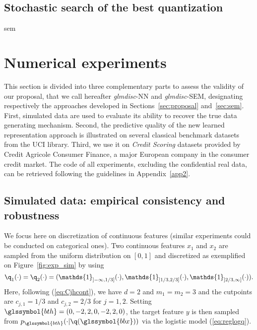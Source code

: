 \subsection{Stochastic search of the best quantization} \label{subsec:stoch}

\gls{sem}




\section{Numerical experiments} \label{sec:experiments}

This section is divided into three complementary parts to assess the validity of our proposal, that we call hereafter \textit{glmdisc}-NN and \textit{glmdisc}-SEM, designating respectively the approaches developed in Sections~\ref{sec:proposal} and~\ref{sec:sem}. First, simulated data are used to evaluate its ability to recover the true data generating mechanism. Second, the predictive quality of the new learned representation approach is illustrated on several classical benchmark datasets from the UCI library. Third, we use it on \textit{Credit Scoring} datasets provided by Credit Agricole Consumer Finance, a major European company in the consumer credit market. The code of all experiments, excluding the confidential real data, can be retrieved following the guidelines in Appendix~\ref{app2}.


\subsection{Simulated data: empirical consistency and robustness}

We focus here on discretization of continuous features (similar experiments could be conducted on categorical ones). Two continuous features $x_1$ and $x_2$ are sampled from the uniform distribution on $[0,1]$ and discretized as exemplified on Figure~\ref{fig:exp_sim} by using
\[\q_1(\cdot)=\q_2(\cdot) = (\mathds{1}_{]-\infty,1/3]}(\cdot),\mathds{1}_{]1/3,2/3]}(\cdot),\mathds{1}_{]2/3,\infty]}(\cdot)).\]
Here, following (\ref{eq:Cjhcont}), we have $d=2$ and $m_1=m_2=3$ and the cutpoints are $c_{j,1}=1/3$ and $c_{j,2}=2/3$ for $j=1,2$. Setting $\glssymbol{bth}=(0,-2,2,0,-2,2,0)$, the target feature $y$ is then sampled from $p_{\glssymbol{bth}}(\cdot | \q(\glssymbol{bbx}))$ via the logistic model (\ref{eq:reglogq}).

